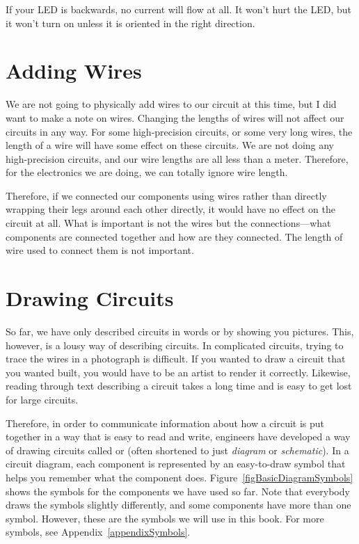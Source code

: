 If your LED is backwards, no current will flow at all. 
It won't hurt the LED, but it won't turn on unless it is oriented in the right direction.

\section{Adding Wires}

We are not going to physically add wires to our circuit at this time, but I did want to make a note on wires.
Changing the lengths of wires will not affect our circuits in any way.
For some high-precision circuits, or some very long wires, the length of a wire will have some effect on these circuits.
We are not doing any high-precision circuits, and our wire lengths are all less than a meter.
Therefore, for the electronics we are doing, we can totally ignore wire length.

Therefore, if we connected our components using wires rather than directly wrapping their legs around each other directly, it would have no effect on the circuit at all.
What is important is not the wires but the connections---what components are connected together and how are they connected.
The length of wire used to connect them is not important.

\section{Drawing Circuits}

So far, we have only described circuits in words or by showing you pictures.
This, however, is a lousy way of describing circuits.
In complicated circuits, trying to trace the wires in a photograph is difficult.
If you wanted to draw a circuit that you wanted built, you would have to be an artist to render it correctly.
Likewise, reading through text describing a circuit takes a long time and is easy to get lost for large circuits.

Therefore, in order to communicate information about how a circuit is put together in a way that is easy to read and write, engineers have developed a way of drawing circuits called  or  (often shortened to just \emph{diagram} or \emph{schematic}).
In a circuit diagram, each component is represented by an easy-to-draw symbol that helps you remember what the component does.
Figure~\ref{figBasicDiagramSymbols} shows the symbols for the components we have used so far.
Note that everybody draws the symbols slightly differently, and some components have more than one symbol.
However, these are the symbols we will use in this book.
For more symbols, see Appendix~\ref{appendixSymbols}.

